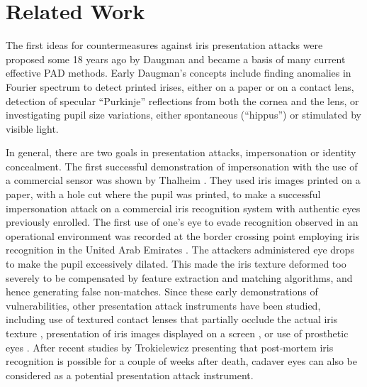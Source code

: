 \section{Related Work}
\label{sec:related_work}

The first ideas for countermeasures against iris presentation attacks were proposed some 18 years ago by Daugman \cite{Daugman_IMAIP_2000} and became a basis of many current effective PAD methods. Early Daugman's concepts include finding anomalies in Fourier spectrum to detect printed irises, either on a paper or on a contact lens, detection of specular ``Purkinje'' reflections from both the cornea and the lens, or investigating pupil size variations, either spontaneous (``hippus'') or stimulated by visible light.

In general, there are two goals in presentation attacks, impersonation or identity concealment. The first successful demonstration of impersonation with the use of a commercial sensor was shown by Thalheim \etal \cite{Thalheim_CT_2002}. They used iris images printed on a paper, with a hole cut where the pupil was printed, to make a successful impersonation attack on a commercial iris recognition system with authentic eyes previously enrolled. The first use of one's eye to evade recognition observed in an operational environment was recorded at the border crossing point employing iris recognition in the United Arab Emirates \cite{Al-Raisi_TI_2008}. The attackers administered eye drops to make the pupil excessively dilated. This made the iris texture deformed too severely to be compensated by feature extraction and matching algorithms, and hence generating false non-matches. Since these early demonstrations of vulnerabilities, other presentation attack instruments have been studied, including use of textured contact lenses that partially occlude the actual iris texture \cite{Doyle_ICB_2013}, presentation of iris images displayed on a screen \cite{HeXiaofu_ICB_2009}, or use of prosthetic eyes \cite{Zuo_TIFS_2007}. After recent studies by Trokielewicz \etal \cite{Trokielewicz_BTAS_2016} presenting that post-mortem iris recognition is possible for a couple of weeks after death, cadaver eyes can also be considered as a potential presentation attack instrument.

